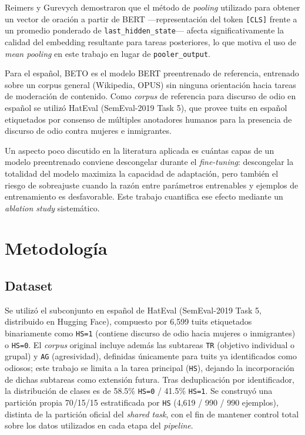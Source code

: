 \documentclass[conference]{IEEEtran}
\begin{document}
Reimers y Gurevych \cite{reimers2019sentencebert} demostraron que el método de \textit{pooling} utilizado para obtener un vector de oración a partir de BERT —representación del token \texttt{[CLS]} frente a un promedio ponderado de \texttt{last\_hidden\_state}— afecta significativamente la calidad del embedding resultante para tareas posteriores, lo que motiva el uso de \textit{mean pooling} en este trabajo en lugar de \texttt{pooler\_output}.

Para el español, BETO \cite{canete2020beto} es el modelo BERT preentrenado de referencia, entrenado sobre un corpus general (Wikipedia, OPUS) sin ninguna orientación hacia tareas de moderación de contenido. Como \textit{corpus} de referencia para discurso de odio en español se utilizó HatEval \cite{basile2019hateval} (SemEval-2019 Task 5), que provee tuits en español etiquetados por consenso de múltiples anotadores humanos para la presencia de discurso de odio contra mujeres e inmigrantes.

Un aspecto poco discutido en la literatura aplicada es cuántas capas de un modelo preentrenado conviene descongelar durante el \textit{fine-tuning}: descongelar la totalidad del modelo maximiza la capacidad de adaptación, pero también el riesgo de sobreajuste cuando la razón entre parámetros entrenables y ejemplos de entrenamiento es desfavorable. Este trabajo cuantifica ese efecto mediante un \textit{ablation study} sistemático.

\section{Metodología}

\subsection{Dataset}
Se utilizó el subconjunto en español de HatEval (SemEval-2019 Task 5, distribuido en Hugging Face), compuesto por 6{,}599 tuits etiquetados binariamente como \texttt{HS=1} (contiene discurso de odio hacia mujeres o inmigrantes) o \texttt{HS=0}. El \textit{corpus} original incluye además las subtareas \texttt{TR} (objetivo individual o grupal) y \texttt{AG} (agresividad), definidas únicamente para tuits ya identificados como odiosos; este trabajo se limita a la tarea principal (\texttt{HS}), dejando la incorporación de dichas subtareas como extensión futura. Tras deduplicación por identificador, la distribución de clases es de 58.5\% \texttt{HS=0} / 41.5\% \texttt{HS=1}. Se construyó una partición propia 70/15/15 estratificada por \texttt{HS} (4{,}619 / 990 / 990 ejemplos), distinta de la partición oficial del \textit{shared task}, con el fin de mantener control total sobre los datos utilizados en cada etapa del \textit{pipeline}.
\end{document}
